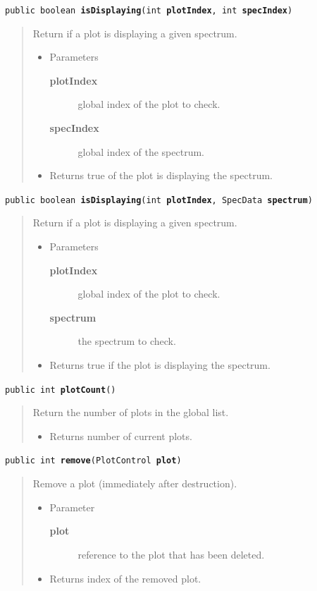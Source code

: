 \documentclass[twoside,11pt]{article}
\renewcommand{\_}{\texttt{\symbol{95}}}
\newcommand{\method}[1]{\texttt{#1}}
\newenvironment{desc}{\begin{quote}}{\end{quote}}
\begin{document}
\method{public boolean \textbf{isDisplaying}(\texttt{int} \textbf{plotIndex}, \texttt{int} \textbf{specIndex})\label{l299}\label{l300}}
\begin{desc}Return if a plot is displaying a given spectrum.
\begin{itemize}
\item{Parameters
  \begin{description}
   \item[\textbf{plotIndex}]{global index of the plot to check.}
   \item[\textbf{specIndex}]{global index of the spectrum.}
  \end{description}}
\end{itemize}
\begin{itemize}
\item{Returns true of the plot is displaying the spectrum. }
\end{itemize}
\end{desc}

\method{public boolean \textbf{isDisplaying}(\texttt{int} \textbf{plotIndex}, \texttt{SpecData} \textbf{spectrum})\label{l301}\label{l302}}
\begin{desc}Return if a plot is displaying a given spectrum.
\begin{itemize}
\item{Parameters
  \begin{description}
   \item[\textbf{plotIndex}]{global index of the plot to check.}
   \item[\textbf{spectrum}]{the spectrum to check.}
  \end{description}}
\end{itemize}
\begin{itemize}
\item{Returns true if the plot is displaying the spectrum. }
\end{itemize}
\end{desc}

\method{public int \textbf{plotCount}()\label{l303}\label{l304}}
\begin{desc}Return the number of plots in the global list.
\begin{itemize}
\item{Returns number of current plots. }
\end{itemize}
\end{desc}

\method{public int \textbf{remove}(\texttt{PlotControl} \textbf{plot})\label{l305}\label{l306}}
\begin{desc}Remove a plot (immediately after destruction).
\begin{itemize}
\item{Parameter
  \begin{description}
   \item[\textbf{plot}]{reference to the plot that has been deleted.}
  \end{description}}
\end{itemize}
\begin{itemize}
\item{Returns index of the removed plot. }
\end{itemize}
\end{desc}
\end{document}
